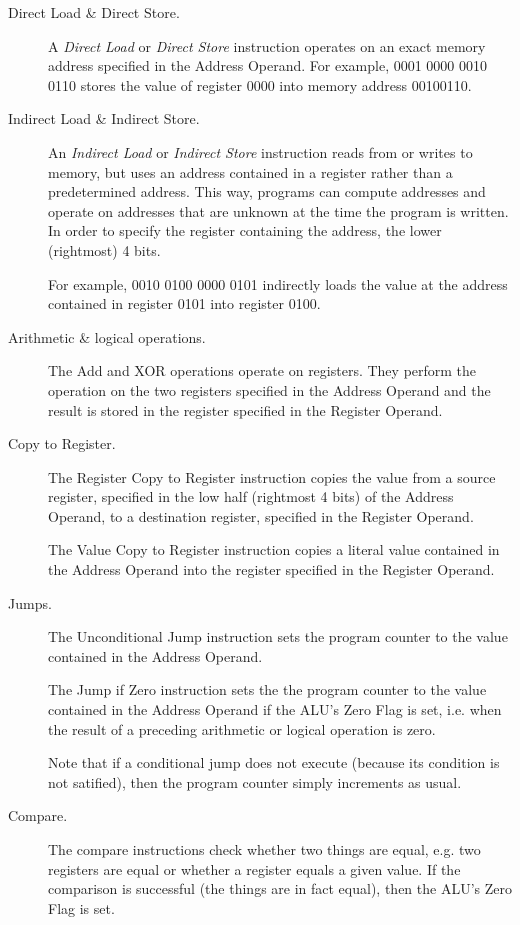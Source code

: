 \documentclass[11pt]{article}
\begin{document}
\begin{description}
\item[Direct Load \& Direct Store.]
  A \emph{Direct Load} or \emph{Direct Store} instruction operates on an exact
  memory address specified in the Address Operand.
  For example, 0001 0000 0010 0110 stores the value of register 0000 into memory
  address 00100110.

\item[Indirect Load \& Indirect Store.]
  An \emph{Indirect Load} or \emph{Indirect Store} instruction reads from or
  writes to memory, but uses an address contained in a register rather than a
  predetermined address.
  This way, programs can compute addresses and operate on addresses that are
  unknown at the time the program is written.
  In order to specify the register containing the address, the lower (rightmost)
  4 bits.

  For example, 0010 0100 0000 0101 indirectly loads the value at the address
  contained in register 0101 into register 0100.

\item[Arithmetic \& logical operations.]
  The Add and XOR operations operate on registers. They perform the operation on
  the two registers specified in the Address Operand and the result is stored in
  the register specified in the Register Operand.

\item[Copy to Register.]
  The Register Copy to Register instruction copies the value from a source
  register, specified in the low half (rightmost 4 bits) of the Address Operand,
  to a destination register, specified in the Register Operand.

  The Value Copy to Register instruction copies a literal value contained in the
  Address Operand into the register specified in the Register Operand.

\item[Jumps.]
  The Unconditional Jump instruction sets the program counter to the value
  contained in the Address Operand.

  The Jump if Zero instruction sets the the program counter to the value
  contained in the Address Operand if the ALU's Zero Flag is set, i.e. when the
  result of a preceding arithmetic or logical operation is zero.

  Note that if a conditional jump does not execute (because its condition is not
  satified), then the program counter simply increments as usual.

\item[Compare.]
  The compare instructions check whether two things are equal, e.g.  two
  registers are equal or whether a register equals a given value.
  If the comparison is successful (the things are in fact equal), then the ALU's
  Zero Flag is set.
\end{description}
\end{document}
